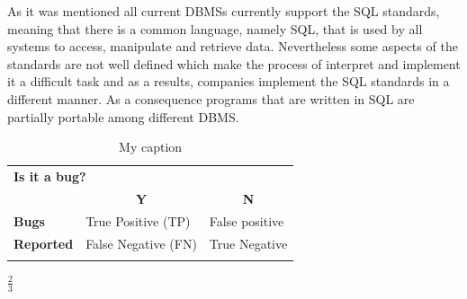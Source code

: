 As it was mentioned all current DBMSs currently support the SQL standards, meaning that there is a common language, namely SQL, that is used by all systems to access, manipulate and retrieve data. Nevertheless some aspects of the standards are not well defined which make the process of interpret and implement it a difficult task and as a results, companies implement the SQL standards in a different manner. As a consequence programs that are written in SQL are partially portable among different DBMS.  



\begin{table}[h]
\centering
\caption{My caption}
\label{my-label}
\begin{tabular}{lll}
\multicolumn{3}{l}{\textbf{Is it a bug?}}                                                                               \\
                                       & \multicolumn{1}{c}{\textbf{Y}}           & \multicolumn{1}{c}{\textbf{N}}      \\ \cline{2-3} 
\multicolumn{1}{l|}{\textbf{Bugs}}     & \multicolumn{1}{l|}{True Positive (TP)}  & \multicolumn{1}{l|}{False positive} \\ \cline{2-3} 
\multicolumn{1}{l|}{\textbf{Reported}} & \multicolumn{1}{l|}{False Negative (FN)} & \multicolumn{1}{l|}{True Negative}  \\ \cline{2-3} 
                                       &                                          &                                    
\end{tabular}
\end{table}


\begin{math}
\frac{2}{3}
\end{math}